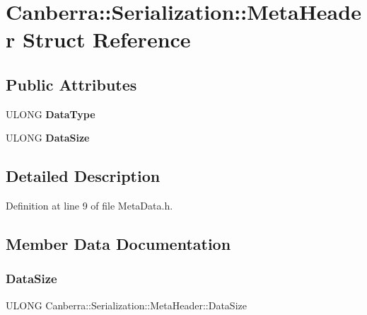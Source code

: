 \hypertarget{struct_canberra_1_1_serialization_1_1_meta_header}{}\section{Canberra\+:\+:Serialization\+:\+:Meta\+Header Struct Reference}
\label{struct_canberra_1_1_serialization_1_1_meta_header}
\subsection*{Public Attributes}
\begin{DoxyCompactItemize}
\item 
\mbox{\label{struct_canberra_1_1_serialization_1_1_meta_header_a5acce9362261fedafd7f48b6943dc1ef}} 
U\+L\+O\+NG {\bfseries Data\+Type}
\item 
\mbox{\label{struct_canberra_1_1_serialization_1_1_meta_header_a9a9f6f8ff180f8dfd002f4b01a5fc15a}} 
U\+L\+O\+NG {\bfseries Data\+Size}
\end{DoxyCompactItemize}


\subsection{Detailed Description}


Definition at line 9 of file Meta\+Data.\+h.



\subsection{Member Data Documentation}
\mbox{\label{struct_canberra_1_1_serialization_1_1_meta_header_a9a9f6f8ff180f8dfd002f4b01a5fc15a}} 
\subsubsection{\texorpdfstring{Data\+Size}{DataSize}}
{\footnotesize\ttfamily U\+L\+O\+NG Canberra\+::\+Serialization\+::\+Meta\+Header\+::\+Data\+Size}



